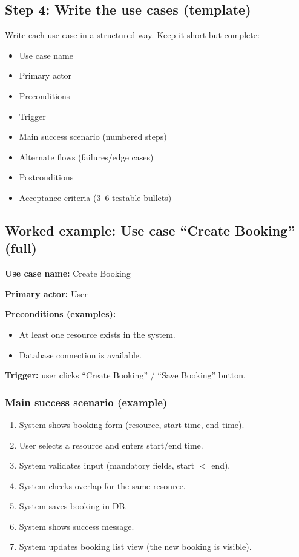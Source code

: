 \documentclass[11pt]{article}
\begin{document}
\subsection{Step 4: Write the use cases (template)}
Write each use case in a structured way. Keep it short but complete:
\begin{itemize}
  \item Use case name
  \item Primary actor
  \item Preconditions
  \item Trigger
  \item Main success scenario (numbered steps)
  \item Alternate flows (failures/edge cases)
  \item Postconditions
  \item Acceptance criteria (3--6 testable bullets)
\end{itemize}

\subsection{Worked example: Use case ``Create Booking'' (full)}
\textbf{Use case name:} Create Booking\par
\textbf{Primary actor:} User\par
\textbf{Preconditions (examples):}
\begin{itemize}
  \item At least one resource exists in the system.
  \item Database connection is available.
\end{itemize}
\textbf{Trigger:} user clicks ``Create Booking'' / ``Save Booking'' button.

\subsubsection*{Main success scenario (example)}
\begin{enumerate}
  \item System shows booking form (resource, start time, end time).
  \item User selects a resource and enters start/end time.
  \item System validates input (mandatory fields, start $<$ end).
  \item System checks overlap for the same resource.
  \item System saves booking in DB.
  \item System shows success message.
  \item System updates booking list view (the new booking is visible).
\end{enumerate}
\end{document}
